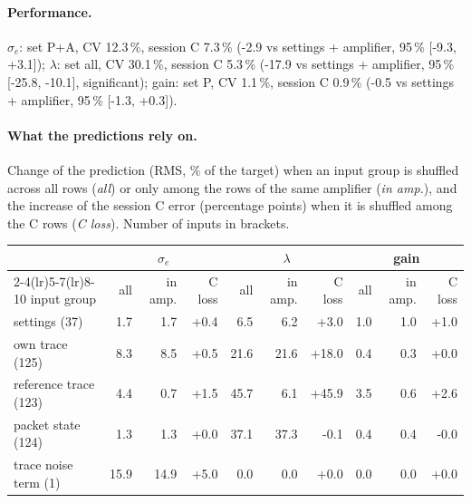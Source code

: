 \paragraph{Performance.}
$\sigma_e$: set P+A, CV 12.3\,\%, session C 7.3\,\% (-2.9 vs settings + amplifier, 95\,\% [-9.3, +3.1]); $\lambda$: set all, CV 30.1\,\%, session C 5.3\,\% (-17.9 vs settings + amplifier, 95\,\% [-25.8, -10.1], significant); gain: set P, CV 1.1\,\%, session C 0.9\,\% (-0.5 vs settings + amplifier, 95\,\% [-1.3, +0.3]).
\paragraph{What the predictions rely on.} Change of the prediction (RMS, \% of the target) when an input group is shuffled across all rows (\emph{all}) or only among the rows of the same amplifier (\emph{in amp.}), and the increase of the session C error (percentage points) when it is shuffled among the C rows (\emph{C loss}). Number of inputs in brackets.
\begin{center}\footnotesize
\begin{tabular}{lrrrrrrrrr}
\toprule
 & \multicolumn{3}{c}{$\sigma_e$} & \multicolumn{3}{c}{$\lambda$} & \multicolumn{3}{c}{gain} \\
\cmidrule(lr){2-4}\cmidrule(lr){5-7}\cmidrule(lr){8-10}
input group & all & in amp. & C loss & all & in amp. & C loss & all & in amp. & C loss \\
\midrule
settings (37) & 1.7 & 1.7 & +0.4 & 6.5 & 6.2 & +3.0 & 1.0 & 1.0 & +1.0 \\
own trace (125) & 8.3 & 8.5 & +0.5 & 21.6 & 21.6 & +18.0 & 0.4 & 0.3 & +0.0 \\
reference trace (123) & 4.4 & 0.7 & +1.5 & 45.7 & 6.1 & +45.9 & 3.5 & 0.6 & +2.6 \\
packet state (124) & 1.3 & 1.3 & +0.0 & 37.1 & 37.3 & -0.1 & 0.4 & 0.4 & -0.0 \\
trace noise term (1) & 15.9 & 14.9 & +5.0 & 0.0 & 0.0 & +0.0 & 0.0 & 0.0 & +0.0 \\
\bottomrule
\end{tabular}
\end{center}
